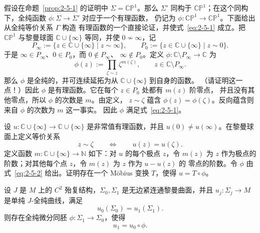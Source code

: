 \begin{remark}\label{rem:2-5-2}
假设在命题~\ref{prop:2-5-1} 的证明中 $\Sigma=\mathbb{CP}^1$。那么 $\Sigma'$ 同构于
$\mathbb{CP}^1$；在这个同构下，全纯函数 $\phi:\Sigma\to\Sigma'$ 对应于一个有理函数，
仍记为 $\phi:\mathbb{CP}^1\to\mathbb{CP}^1$。下面给出从全纯等价关系 $\Gamma$ 构造
有理函数的一个直接论证，并使式~\eqref{eq:2-5-1} 成立。把 $\mathbb{CP}^1$ 与黎曼球面
$\mathbb C\cup\{\infty\}$ 等同，并使 $0\not\sim\infty$，记
\[
  P_\infty:=\{z\in\mathbb C\cup\{\infty\}\mid z\sim\infty\},
  \qquad
  P_0:=\{z\in\mathbb C\cup\{\infty\}\mid z\sim0\}.
\]
于是 $\infty\in P_\infty$、$0\in P_0$，而 $0\notin P_\infty$、
$\infty\notin P_0$。定义 $\phi:\mathbb C\setminus P_\infty\to\mathbb C$ 为
\begin{equation}\label{eq:2-5-2}
  \phi(z):=\prod_{\zeta\sim z}\zeta^{m(\zeta)},
  \qquad z\in\mathbb C\setminus P_\infty.
\end{equation}
那么 $\phi$ 是全纯的，并可连续延拓为从 $\mathbb C\cup\{\infty\}$ 到自身的函数。
（请证明这一点！）因此 $\phi$ 是有理函数。它在每个 $z\in P_0$ 处都有 $m(z)$ 阶零点，
并且没有其他零点，所以 $\phi$ 的次数是 $m$。由定义，
$z\sim\zeta$ 蕴含 $\phi(z)=\phi(\zeta)$。反向蕴含则来自 $\phi$ 的次数为 $m$ 这一事实。
因此 $\phi$ 满足式~\eqref{eq:2-5-1}。
\end{remark}

\begin{exercise}\label{ex:2-5-3}
设 $u:\mathbb C\cup\{\infty\}\to\mathbb C\cup\{\infty\}$ 是非常值有理函数，并且
$u(0)\ne u(\infty)$。在黎曼球面上定义等价关系
\[
  z\sim\zeta
  \qquad\Longleftrightarrow\qquad
  u(z)=u(\zeta).
\]
定义函数 $m:\mathbb C\cup\{\infty\}\to\mathbb N$ 如下：对 $u$ 的每个极点 $z$，令
$m(z)$ 为 $z$ 作为极点的阶数；对其他每个点 $z$，令 $m(z)$ 为 $z$ 作为 $u-u(z)$ 的
零点的阶数。令 $\phi$ 由式~\eqref{eq:2-5-2} 给出。证明存在一个 Möbius 变换 $T$，使得
$u=T\circ\phi$。
\end{exercise}

\begin{corollary}\label{cor:2-5-4}
设 $J$ 是 $M$ 上的 $C^2$ 殆复结构，$\Sigma_0,\Sigma_1$ 是无边紧连通黎曼曲面，并且
$u_j:\Sigma_j\to M$ 是单纯 $J$-全纯曲线，满足
\[
  u_0(\Sigma_0)=u_1(\Sigma_1).
\]
则存在全纯微分同胚 $\phi:\Sigma_1\to\Sigma_0$，使得
\[
  u_1=u_0\circ\phi.
\]
\end{corollary}

